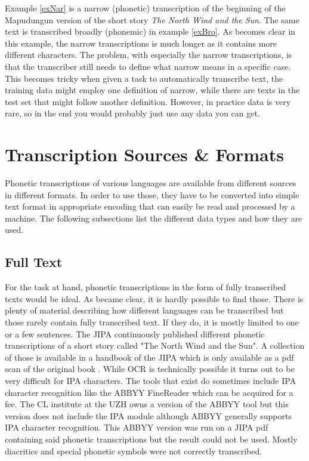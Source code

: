 \begin{covexamples}
\item \label{exNar} 
\item \label{exBro}
\end{covexamples}



Example \ref{exNar} is a narrow (phonetic) transcription of the beginning of the Mapudungun version of the short story \textit{The North Wind and the Sun}. The same text is transcribed broadly (phonemic) in example \ref{exBro}. As becomes clear in this example, the narrow transcriptions is much longer as it contains more different characters. The problem, with especially the narrow transcriptions, is that the transcriber still needs to define what narrow means in a specific case. This becomes tricky when given a task to automatically transcribe text, the training data might employ one definition of narrow, while there are texts in the test set that might follow another definition. However, in practice data is very rare, so in the end you would probably just use any data you can get.


\section{Transcription Sources \& Formats}
Phonetic transcriptions of various languages are available from different sources in different formats. In order to use those, they have to be converted into simple text format in appropriate encoding that can easily be read and processed by a machine. The following subsections list the different data types and how they are used.

\subsection{Full Text}
For the task at hand, phonetic transcriptions in the form of fully transcribed texts would be ideal. As became clear, it is hardly possible to find those. There is plenty of material describing how different languages can be transcribed but those rarely contain fully transcribed text. If they do, it is mostly limited to one or a few sentences. The JIPA continuously published different phonetic transcriptions of a short story called "The North Wind and the Sun". A collection of those is available in a handbook of the JIPA which is only available as a pdf scan of the original book \citep{JIPA2010}. While OCR is technically possible it turns out to be very difficult for IPA characters. The tools that exist do sometimes include IPA character recognition like the ABBYY FineReader which can be acquired for a fee. The CL institute at the UZH owns a version of the ABBYY tool but this version does not include the IPA module although ABBYY generally supports IPA character recognition. This ABBYY version was run on a JIPA pdf containing said phonetic transcriptions but the result could not be used. Mostly diacritics and special phonetic symbols were not correctly transcribed.

